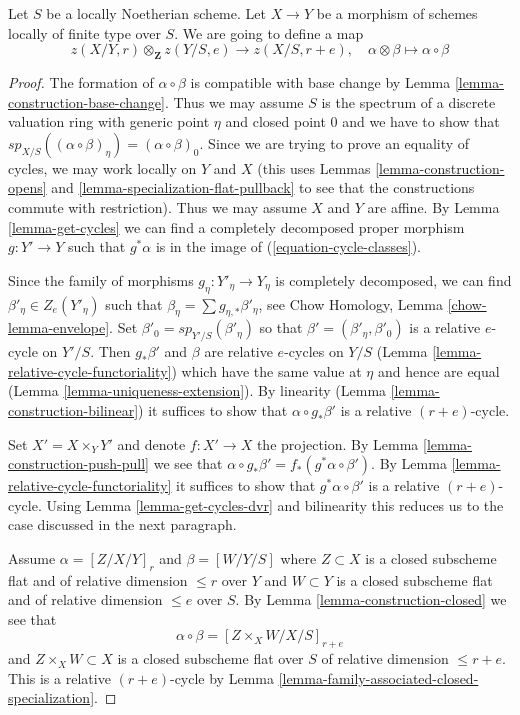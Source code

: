 \documentclass{stacks-project}
\theoremstyle{plain}
\theoremstyle{definition}
\theoremstyle{remark}
\numberwithin{equation}{subsection}
\begin{document}
\noindent
Let $S$ be a locally Noetherian scheme. Let $X \to Y$
be a morphism of schemes locally of finite type over $S$.
We are going to define a map
$$
z(X/Y, r) \otimes_\mathbf{Z} z(Y/S, e) \longrightarrow z(X/S, r + e),\quad
\alpha \otimes \beta \longmapsto \alpha \circ \beta
$$

\begin{proof}
The formation of $\alpha \circ \beta$ is compatible with base change
by Lemma \ref{lemma-construction-base-change}. Thus we may assume
$S$ is the spectrum of a discrete valuation ring with generic point
$\eta$ and closed point $0$ and we have to show that
$sp_{X/S}((\alpha \circ \beta)_\eta) = (\alpha \circ \beta)_0$.
Since we are trying to prove an equality of cycles, we may
work locally on $Y$ and $X$ (this uses
Lemmas \ref{lemma-construction-opens} and
\ref{lemma-specialization-flat-pullback}
to see that the constructions commute with restriction).
Thus we may assume $X$ and $Y$ are affine.
By Lemma \ref{lemma-get-cycles}
we can find a completely decomposed proper morphism
$g : Y' \to Y$ such that $g^*\alpha$ is in the image of
(\ref{equation-cycle-classes}).

\medskip\noindent
Since the family of morphisms $g_\eta : Y'_\eta \to Y_\eta$
is completely decomposed, we can find $\beta'_\eta \in Z_e(Y'_\eta)$ such that
$\beta_\eta = \sum g_{\eta, *}\beta'_\eta$, see
Chow Homology, Lemma \ref{chow-lemma-envelope}.
Set $\beta'_0 = sp_{Y'/S}(\beta'_\eta)$ so that
$\beta' = (\beta'_\eta, \beta'_0)$ is a relative $e$-cycle on $Y'/S$. Then
$g_*\beta'$ and $\beta$ are relative $e$-cycles
on $Y/S$ (Lemma \ref{lemma-relative-cycle-functoriality})
which have the same value at $\eta$ and hence are equal
(Lemma \ref{lemma-uniqueness-extension}). By linearity
(Lemma \ref{lemma-construction-bilinear})
it suffices to show that $\alpha \circ g_*\beta'$
is a relative $(r + e)$-cycle.

\medskip\noindent
Set $X' = X \times_Y Y'$ and denote $f : X' \to X$ the projection.
By Lemma \ref{lemma-construction-push-pull} we see that
$\alpha \circ g_*\beta' = f_*(g^*\alpha \circ \beta')$.
By Lemma \ref{lemma-relative-cycle-functoriality}
it suffices to show that $g^*\alpha \circ \beta'$
is a relative $(r + e)$-cycle. Using Lemma \ref{lemma-get-cycles-dvr}
and bilinearity this reduces us to the case discussed in the next paragraph.

\medskip\noindent
Assume $\alpha = [Z/X/Y]_r$ and $\beta = [W/Y/S]$
where $Z \subset X$ is a closed subscheme flat and of relative
dimension $\leq r$ over $Y$ and $W \subset Y$ is a closed
subscheme flat and of relative dimension $\leq e$ over $S$.
By Lemma \ref{lemma-construction-closed} we see that
$$
\alpha \circ \beta = [Z \times_X W/X/S]_{r + e}
$$
and $Z \times_X W \subset X$ is a closed subscheme flat over $S$
of relative dimension $\leq r + e$. This is a relative $(r + e)$-cycle by
Lemma \ref{lemma-family-associated-closed-specialization}.
\end{proof}
\end{document}
